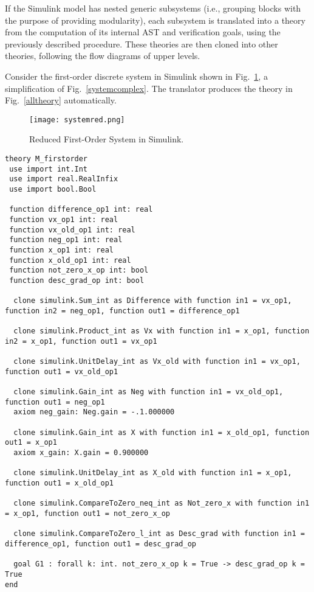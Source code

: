 \documentclass[a4paper]{article}
\begin{document}
If the Simulink model has nested generic subsystems (i.e., grouping blocks with the purpose of providing modularity), each subsystem is translated into a theory from the computation of its internal AST and verification goals, using the previously described procedure. These theories are then cloned into other theories, following the flow diagrams of upper levels. 

Consider the first-order discrete system in Simulink shown in Fig.~\ref{system}, a simplification of Fig.~\ref{systemcomplex}. The translator produces the theory in Fig.~\ref{alltheory} automatically. 

\begin{figure}[!t]
\centering
\texttt{[image: systemred.png]}
\caption{Reduced First-Order System in Simulink.}
\label{system}
\end{figure}

\begin{figure*}[!t]
\centering
\scriptsize
\begin{verbatim}
theory M_firstorder
 use import int.Int
 use import real.RealInfix
 use import bool.Bool

 function difference_op1 int: real
 function vx_op1 int: real
 function vx_old_op1 int: real
 function neg_op1 int: real
 function x_op1 int: real
 function x_old_op1 int: real
 function not_zero_x_op int: bool
 function desc_grad_op int: bool

  clone simulink.Sum_int as Difference with function in1 = vx_op1, function in2 = neg_op1, function out1 = difference_op1

  clone simulink.Product_int as Vx with function in1 = x_op1, function in2 = x_op1, function out1 = vx_op1

  clone simulink.UnitDelay_int as Vx_old with function in1 = vx_op1, function out1 = vx_old_op1

  clone simulink.Gain_int as Neg with function in1 = vx_old_op1, function out1 = neg_op1
  axiom neg_gain: Neg.gain = -.1.000000

  clone simulink.Gain_int as X with function in1 = x_old_op1, function out1 = x_op1
  axiom x_gain: X.gain = 0.900000
 
  clone simulink.UnitDelay_int as X_old with function in1 = x_op1, function out1 = x_old_op1

  clone simulink.CompareToZero_neq_int as Not_zero_x with function in1 = x_op1, function out1 = not_zero_x_op

  clone simulink.CompareToZero_l_int as Desc_grad with function in1 = difference_op1, function out1 = desc_grad_op

  goal G1 : forall k: int. not_zero_x_op k = True -> desc_grad_op k = True
end
\end{verbatim}
\caption{Theory for the First Order System in Fig.~\ref{system}.}
\label{alltheory}
\end{figure*}
\end{document}
